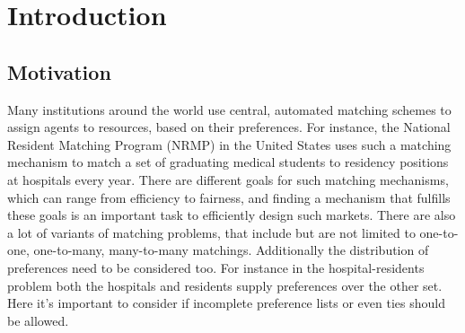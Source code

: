 \section{Introduction}
\label{sec:introduction}

\subsection{Motivation}
Many institutions around the world use central, automated matching schemes to assign agents to resources, based on their preferences. For instance, the National Resident Matching Program (NRMP) in the United States uses such a matching mechanism to match a set of graduating medical students to residency positions at hospitals every year.\cite{Roth-NRMP} There are different goals for such matching mechanisms, which can range from efficiency to fairness, and finding a mechanism that fulfills these goals is an important task to efficiently design such markets.
There are also a lot of variants of matching problems, that include but are not limited to one-to-one, one-to-many, many-to-many matchings. Additionally the distribution of preferences need to be considered too. For instance in the hospital-residents problem both the hospitals and residents supply preferences over the other set. Here it's important to consider if incomplete preference lists or even ties should be allowed. 

